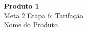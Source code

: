
\begin{flushleft}
	
\vspace*{15cm}	
\textcolor{airdataBlue}{\textbf{\LARGE Produto 1}}\\
\textcolor{airdataBlue}{Meta 2 \textbar{} Etapa 6: Tarifação}\\
\vspace*{5cm}	
Nome do Produto

\end{flushleft}